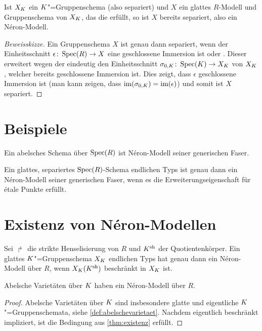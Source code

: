 \documentclass[german]{scrreprt}
\begin{document}
\begin{Bemerkung}\label{nerongruppenschemaglatt}
  Ist $X_{K}$ ein $K$"=Gruppenschema (also separiert) und $X$ ein
  glattes $R$-Modell und Gruppenschema von $X_{K}$, das die
  \NAbbEig erfüllt, so ist $X$ bereits separiert,
  also ein Néron-Modell.
  \cite[1.2, Remark 7]{neron} 
  \begin{proof}[Beweisskizze]
    Ein Gruppenschema $X$ ist genau dann separiert, wenn der
    Einheitsschnitt $\epsilon\colon\operatorname{Spec}(R)\to X$ eine geschlossene
    Immersion ist
    \cite[Lemma 38.6.1]{stacksproject} oder \cite[7.1, Lemma 2]{neron}.
    Dieser erweitert wegen der \NAbbEig eindeutig
    den Einheitsschnitt $\sigma_{0,K}\colon\operatorname{Spec}(K)\to X_{K}$ von
    $X_{K}$, welcher bereits geschlossene Immersion ist.
    Dies zeigt, dass $\epsilon$ geschlossene Immersion ist
    (man kann zeigen, dass $\text{im}(\sigma_{0,K})=\text{im}(\epsilon)$) und
    somit ist $X$ separiert. 
  \end{proof}
\end{Bemerkung}



\section{Beispiele}

\begin{Satz}
  Ein abelsches Schema über $\operatorname{Spec}(R)$ ist Néron-Modell seiner
  generischen Faser.
  \cite[1.2, Proposition 8]{neron}
\end{Satz}

\begin{Satz}
  Ein glattes, separiertes $\operatorname{Spec}(R)$-Schema endlichen Typs ist genau
  dann ein Néron-Modell seiner generischen Faser, wenn es die
  Erweiterungseigenschaft für étale Punkte erfüllt.
  \cite[1.2, Criterion 9]{neron}
\end{Satz}


\section{Existenz von Néron-Modellen}

\begin{Satz}\label{thm:existenz}
  Sei $\Rsh$ die strikte Henselisierung von $R$ und $K^{\text{sh}}$ der
  Quotientenkörper. Ein glattes $K$"=Gruppenschema $X_{K}$ endlichen
  Typs hat genau dann ein Néron-Modell über $R$, wenn $X_{K}(K^{\text{sh}})$
  beschränkt in $X_{K}$ ist.
  \cite[1.3, Theorem 1]{neron}
\end{Satz}
\begin{Korollar}\label{thm:exneronmodellabvarietaet}
  Abelsche Varietäten über $K$ haben ein Néron-Modell über $R$.
  \begin{proof}
    Abelsche Varietäten über $K$ sind insbesondere glatte und
    eigentliche $K$"=Gruppenschemata, siehe
    \autoref{def:abelschevarietaet}.
    Nachdem eigentlich beschränkt impliziert, ist die Bedingung aus
    \autoref{thm:existenz} erfüllt.
  \end{proof}
\end{Korollar}
\end{document}
